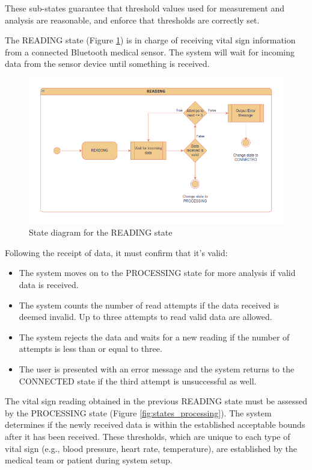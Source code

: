 These sub-states guarantee that threshold values used for measurement and analysis are reasonable, and enforce that thresholds are correctly set.

The READING state (Figure \ref{fig:states_reading}) is in charge of receiving vital sign information from a connected Bluetooth medical sensor. The system will wait for incoming data from the sensor device until something is received.

\begin{figure}[H]
	\centering
	\includegraphics[width=\textwidth]{diagrams/states_reading}
	\caption{State diagram for the READING state}
	\label{fig:states_reading}
\end{figure}

Following the receipt of data, it must confirm that it's valid:

\begin{itemize}
	\item The system moves on to the PROCESSING state for more analysis if valid data is received.
	\item The system counts the number of read attempts if the data received is deemed invalid. Up to three attempts to read valid data are allowed.
	\item The system rejects the data and waits for a new reading if the number of attempts is less than or equal to three.
	\item The user is presented with an error message and the system returns to the CONNECTED state if the third attempt is unsuccessful as well.
\end{itemize}

The vital sign reading obtained in the previous READING state must be assessed by the PROCESSING state (Figure \ref{fig:states_processing}). The system determines if the newly received data is within the established acceptable bounds after it has been received. These thresholds, which are unique to each type of vital sign (e.g., blood pressure, heart rate, temperature), are established by the medical team or patient during system setup.


